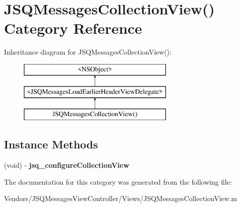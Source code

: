 \hypertarget{category_j_s_q_messages_collection_view_07_08}{}\section{J\+S\+Q\+Messages\+Collection\+View() Category Reference}
\label{category_j_s_q_messages_collection_view_07_08}
Inheritance diagram for J\+S\+Q\+Messages\+Collection\+View()\+:\begin{figure}[H]
\begin{center}
\leavevmode
\includegraphics[height=3.000000cm]{category_j_s_q_messages_collection_view_07_08}
\end{center}
\end{figure}
\subsection*{Instance Methods}
\begin{DoxyCompactItemize}
\item 
\hypertarget{category_j_s_q_messages_collection_view_07_08_aaaa956ba91882792a8f382503591778d}{}(void) -\/ {\bfseries jsq\+\_\+configure\+Collection\+View}\label{category_j_s_q_messages_collection_view_07_08_aaaa956ba91882792a8f382503591778d}

\end{DoxyCompactItemize}


The documentation for this category was generated from the following file\+:\begin{DoxyCompactItemize}
\item 
Vendors/\+J\+S\+Q\+Messages\+View\+Controller/\+Views/J\+S\+Q\+Messages\+Collection\+View.\+m\end{DoxyCompactItemize}
